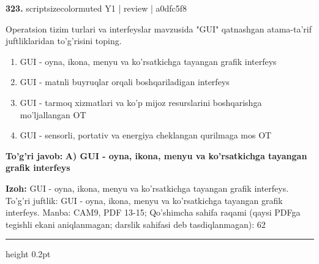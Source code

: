\documentclass[10pt,a4paper]{article}
\begin{document}
{\bfseries\sffamily\color{ink} 323.} {scriptsizecolor{muted} Y1 | review | a0dfc5f8}
\par
Operatsion tizim turlari va interfeyslar mavzusida "GUI" qatnashgan atama-ta'rif juftliklaridan to'g'risini toping.
\begin{enumerate}[label=\Alph*),leftmargin=9mm]
\item GUI - oyna, ikona, menyu va ko'rsatkichga tayangan grafik interfeys
\item GUI - matnli buyruqlar orqali boshqariladigan interfeys
\item GUI - tarmoq xizmatlari va ko'p mijoz resurslarini boshqarishga mo'ljallangan OT
\item GUI - sensorli, portativ va energiya cheklangan qurilmaga mos OT
\end{enumerate}
\begin{tcolorbox}[enhanced,breakable,colback=teal!4,colframe=teal!60!black,boxrule=0.45pt,arc=1.2mm,left=2.7mm,right=2.7mm,top=1.8mm,bottom=1.8mm,before skip=2mm,after skip=2mm]
{\bfseries\sffamily\color{teal}To'g'ri javob:} \textbf{A) GUI - oyna, ikona, menyu va ko'rsatkichga tayangan grafik interfeys}
\par\smallskip
{\bfseries Izoh:} GUI - oyna, ikona, menyu va ko'rsatkichga tayangan grafik interfeys. To'g'ri juftlik: GUI - oyna, ikona, menyu va ko'rsatkichga tayangan grafik interfeys. Manba: CAM9, PDF 13-15; Qo'shimcha sahifa raqami (qaysi PDFga tegishli ekani aniqlanmagan; darslik sahifasi deb tasdiqlanmagan): 62
\end{tcolorbox}
\vspace{2mm}\hrule height 0.2pt\vspace{3mm}
\end{document}
